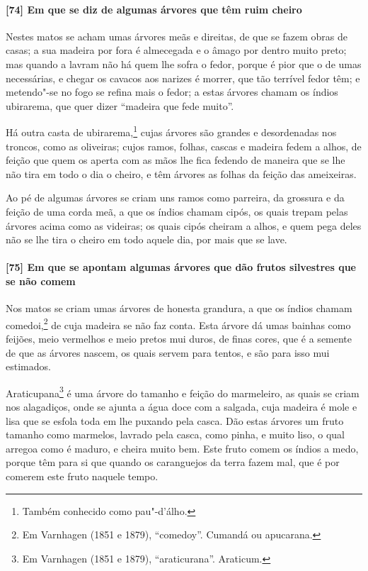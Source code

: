 \paragraph{[74] Em que se diz de algumas árvores que têm ruim cheiro}\quad
Nestes matos se acham umas árvores meãs e direitas, de que se fazem obras de casas; a sua
madeira por fora é almecegada e o âmago por dentro muito preto; mas quando a lavram não há
quem lhe sofra o fedor, porque é pior que o de umas necessárias, e chegar os cavacos aos
narizes é morrer, que tão terrível fedor têm; e metendo"-se no fogo se refina mais o fedor;
a estas árvores chamam os índios ubirarema, que quer dizer ``madeira que fede muito''.

Há outra casta de ubirarema,\footnote{ Também conhecido como pau"-d'álho.} cujas árvores
são grandes e desordenadas nos troncos, como as oliveiras; cujos ramos, folhas, cascas e
madeira fedem a alhos, de feição que quem os aperta com as mãos lhe fica fedendo de
maneira que se lhe não tira em todo o dia o cheiro, e têm árvores as folhas da feição das
ameixeiras.

Ao pé de algumas árvores se criam uns ramos como parreira, da grossura e da feição de uma
corda meã, a que os índios chamam cipós, os quais trepam pelas árvores acima como as
videiras; os quais cipós cheiram a alhos, e quem pega deles não se lhe tira o cheiro em
todo aquele dia, por mais que se lave.

\paragraph{[75] Em que se apontam algumas árvores que dão frutos silvestres que se não
comem}\quad
Nos matos se criam umas árvores de honesta grandura, a que os índios chamam
comedoi,\footnote{ Em Varnhagen (1851 e 1879), ``comedoy''. Cumandá ou apucarana.} de cuja
madeira se não faz conta. Esta árvore dá umas bainhas como feijões, meio vermelhos e meio
pretos mui duros, de finas cores, que é a semente de que as árvores nascem, os quais
servem para tentos, e são para isso mui estimados.


Araticupana\footnote{ Em Varnhagen (1851 e 1879), ``araticurana''. Araticum.} é uma árvore
do tamanho e feição do marmeleiro, as quais se criam nos alagadiços, onde se ajunta a água
doce com a salgada, cuja madeira é mole e lisa que se esfola toda em lhe puxando pela
casca. Dão estas árvores um fruto tamanho como marmelos, lavrado pela casca, como pinha, e
muito liso, o qual arregoa como é maduro, e cheira muito bem. Este fruto comem os índios a
medo, porque têm para si que quando os caranguejos da terra fazem mal, que é por comerem
este fruto naquele tempo.

